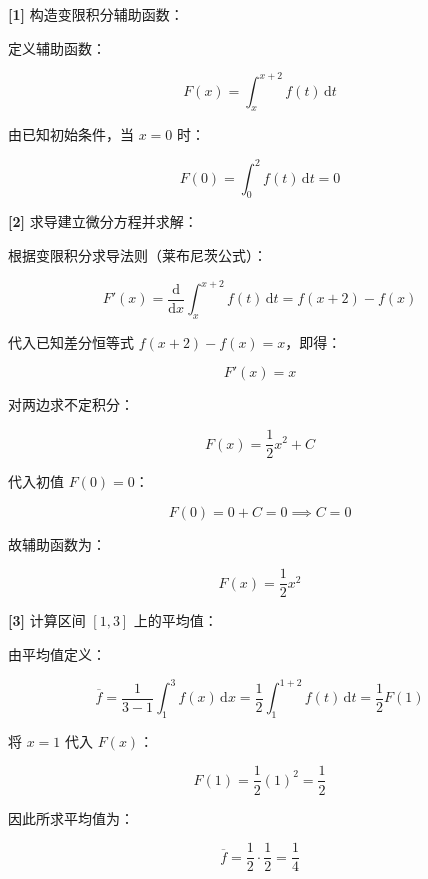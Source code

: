 \documentclass[11pt,a4paper,UTF8]{ctexart}
\begin{document}
\begin{solbox}[分步推导与答题规范]
\textbf{[1]} 构造变限积分辅助函数：

定义辅助函数：


\begin{equation*}
F(x) = \int_x^{x+2} f(t)\,\mathrm{d}t
\end{equation*}


由已知初始条件，当 $x = 0$ 时：


\begin{equation*}
F(0) = \int_0^2 f(t)\,\mathrm{d}t = 0
\end{equation*}


\textbf{[2]} 求导建立微分方程并求解：

根据变限积分求导法则（莱布尼茨公式）：


\begin{equation*}
F'(x) = \frac{\mathrm{d}}{\mathrm{d}x}\int_x^{x+2} f(t)\,\mathrm{d}t = f(x+2) - f(x)
\end{equation*}


代入已知差分恒等式 $f(x+2) - f(x) = x$，即得：


\begin{equation*}
F'(x) = x
\end{equation*}


对两边求不定积分：


\begin{equation*}
F(x) = \frac{1}{2}x^2 + C
\end{equation*}


代入初值 $F(0) = 0$：


\begin{equation*}
F(0) = 0 + C = 0 \implies C = 0
\end{equation*}


故辅助函数为：


\begin{equation*}
F(x) = \frac{1}{2}x^2
\end{equation*}


\textbf{[3]} 计算区间 $[1, 3]$ 上的平均值：

由平均值定义：


\begin{equation*}
\overline{f} = \frac{1}{3-1}\int_1^3 f(x)\,\mathrm{d}x = \frac{1}{2}\int_1^{1+2} f(t)\,\mathrm{d}t = \frac{1}{2}F(1)
\end{equation*}


将 $x = 1$ 代入 $F(x)$：


\begin{equation*}
F(1) = \frac{1}{2}(1)^2 = \frac{1}{2}
\end{equation*}


因此所求平均值为：


\begin{equation*}
\overline{f} = \frac{1}{2} \cdot \frac{1}{2} = \frac{1}{4}
\end{equation*}

\end{solbox}
\end{document}
